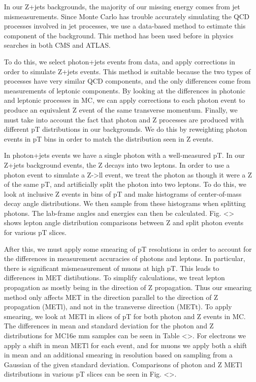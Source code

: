 In our Z+jets backgrounds, the majority of our missing energy comes from jet mismeasurements. Since Monte Carlo has trouble accurately simulating the QCD processes involved in jet processes, we use a data-based method to estimate this component of the background. This method has been used before in physics searches in both CMS and ATLAS.

To do this, we select photon+jets events from data, and apply corrections in order to simulate Z+jets events. This method is suitable because the two types of processes have very similar QCD components, and the only differences come from measurements of leptonic components. By looking at the differences in photonic and leptonic processes in MC, we can apply corrections to each photon event to produce an equivalent Z event of the same transverse momentum. Finally, we must take into account the fact that photon and Z processes are produced with different pT distributions in our backgrounds. We do this by reweighting photon events in pT bins in order to match the distribution seen in Z events.

In photon+jets events we have a single photon with a well-measured pT. In our Z+jets background events, the Z decays into two leptons. In order to use a photon event to simulate a Z->ll event, we treat the photon as though it were a Z of the same pT, and artificially split the photon into two leptons. To do this, we look at inclusive Z events in bins of pT and make histograms of center-of-mass decay angle distributions. We then sample from these histograms when splitting photons. The lab-frame angles and energies can then be calculated. Fig. <> shows lepton angle distribution comparisons between Z and split photon events for various pT slices.

After this, we must apply some smearing of pT resolutions in order to account for the differences in measurement accuracies of photons and leptons. In particular, there is significant mismeasurement of muons at high pT. This leads to differences in MET distibutions. To simplify calculations, we treat lepton propagation as mostly being in the direction of Z propagation. Thus our smearing method only affects MET in the direction parallel to the direction of Z propagation (METl), and not in the transverse direction (METt). To apply smearing, we look at METl in slices of pT for both photon and Z events in MC. The differences in mean and standard deviation for the photon and Z distributions for MC16e mm samples can be seen in Table <>. For electrons we apply a shift in mean METl for each event, and for muons we apply both a shift in mean and an additional smearing in resolution based on sampling from a Gaussian of the given standard deviation. Comparisons of photon and Z METl distributions in various pT slices can be seen in Fig. <>.

